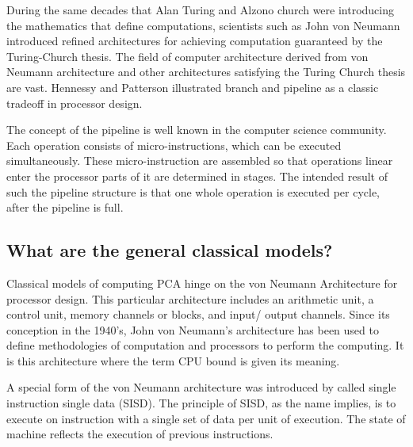 \documentclass[11pt]{article}
\begin{document}
During the same decades that Alan Turing and Alzono church were introducing the mathematics that define computations, scientists such as John von Neumann introduced refined architectures for achieving computation guaranteed by the Turing-Church thesis.   The field of computer architecture derived from von Neumann architecture and other architectures satisfying the Turing Church thesis are vast.   Hennessy and Patterson \cite{hennsessyPatterson} illustrated branch and pipeline as a classic tradeoff in processor design.  %


The concept of the pipeline is well known in the computer science community.  Each operation consists of micro-instructions, %
which can be executed simultaneously.  These micro-instruction are assembled so that operations linear enter %
the processor parts of it are determined in stages.  %
The intended result of such the pipeline structure is that one whole operation is executed per cycle, after the pipeline is full.  %


\subsection{What are the general classical models?}
Classical models of computing PCA hinge on the von Neumann Architecture for processor design.  This particular architecture includes an arithmetic unit, a control unit, memory channels or blocks, and input/ output channels.   Since its conception in the 1940's, John von Neumann's architecture has been used to define methodologies of computation and processors to perform the computing.   It is this architecture where the term CPU bound is given its meaning.

A special form of the von Neumann architecture was introduced by \cite{flynn-m-j} called single instruction single data (SISD).  The principle of SISD, as the name implies, is to execute on instruction with a single set of data per unit of execution.  %
The state of machine reflects the execution of previous instructions.  %
\end{document}
